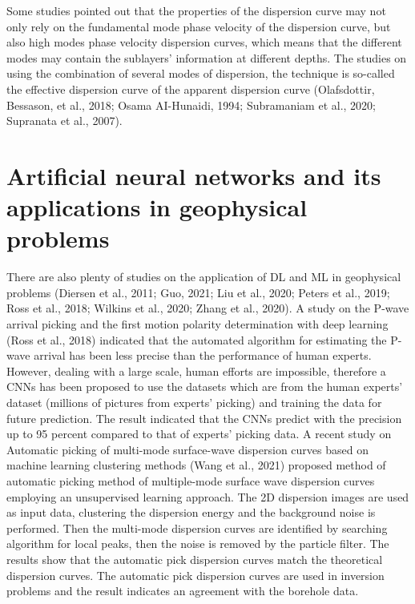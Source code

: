 Some studies pointed out that the properties of the dispersion curve may not only rely on the fundamental mode phase velocity of the dispersion curve, but also high modes phase velocity dispersion curves, which means that the different modes may contain the sublayers’ information at different depths. The studies on using the combination of several modes of dispersion, the technique is so-called the effective dispersion curve of the apparent dispersion curve (Olafsdottir, Bessason, et al., 2018; Osama AI-Hunaidi, 1994; Subramaniam et al., 2020; Supranata et al., 2007). 






\section*{Artificial neural networks and its applications in geophysical problems}

There are also plenty of studies on the application of DL and ML in geophysical problems (Diersen et al., 2011; Guo, 2021; Liu et al., 2020; Peters et al., 2019; Ross et al., 2018; Wilkins et al., 2020; Zhang et al., 2020). A study on the P-wave arrival picking and the first motion polarity determination with deep learning (Ross et al., 2018) indicated that the automated algorithm for estimating the P-wave arrival has been less precise than the performance of human experts. However, dealing with a large scale, human efforts are impossible, therefore a CNNs has been proposed to use the datasets which are from the human experts’ dataset (millions of pictures from experts’ picking) and training the data for future prediction. The result indicated that the CNNs predict with the precision up to 95 percent compared to that of experts’ picking data. A recent study on Automatic picking of multi-mode surface-wave dispersion curves based on machine learning clustering methods (Wang et al., 2021) proposed method of automatic picking method of multiple-mode surface wave dispersion curves employing an unsupervised learning approach. The 2D dispersion images are used as input data, clustering the dispersion energy and the background noise is performed. Then the multi-mode dispersion curves are identified by searching algorithm for local peaks, then the noise is removed by the particle filter. The results show that the automatic pick dispersion curves match the theoretical dispersion curves. The automatic pick dispersion curves are used in inversion problems and the result indicates an agreement with the borehole data. 

